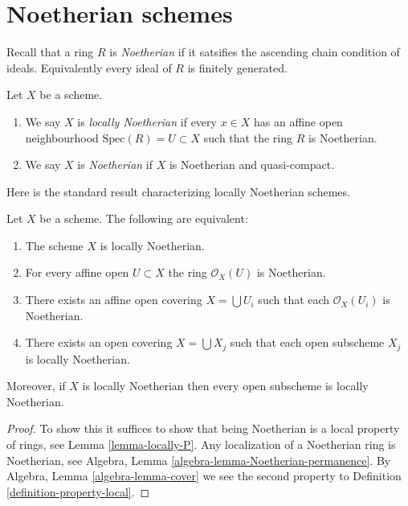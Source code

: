 \section{Noetherian schemes}
\label{section-noetherian}

\noindent
Recall that a ring $R$ is {\it Noetherian} if it satsifies the ascending
chain condition of ideals. Equivalently every ideal of $R$ is finitely
generated.

\begin{definition}
\label{definition-noetherian}
Let $X$ be a scheme.
\begin{enumerate}
\item We say $X$ is {\it locally Noetherian} if every
$x \in X$ has an affine open neighbourhood
$\text{Spec}(R) = U \subset X$ such that the ring $R$ is Noetherian.
\item We say $X$ is {\it Noetherian} if $X$ is Noetherian
and quasi-compact.
\end{enumerate}
\end{definition}

\noindent
Here is the standard result characterizing locally Noetherian schemes.

\begin{lemma}
\label{lemma-locally-Noetherian}
Let $X$ be a scheme. The following are equivalent:
\begin{enumerate}
\item The scheme $X$ is locally Noetherian.
\item For every affine open $U \subset X$ the ring $\mathcal{O}_X(U)$
is Noetherian.
\item There exists an affine open covering $X = \bigcup U_i$ such that
each $\mathcal{O}_X(U_i)$ is Noetherian.
\item There exists an open covering $X = \bigcup X_j$
such that each open subscheme $X_j$ is locally Noetherian.
\end{enumerate}
Moreover, if $X$ is locally Noetherian then every open subscheme
is locally Noetherian.
\end{lemma}

\begin{proof}
To show this it suffices to show that being Noetherian is a local
property of rings, see Lemma \ref{lemma-locally-P}.
Any localization of a Noetherian ring is Noetherian, see
Algebra, Lemma \ref{algebra-lemma-Noetherian-permanence}.
By Algebra, Lemma \ref{algebra-lemma-cover} we see the second
property to Definition \ref{definition-property-local}.
\end{proof}

